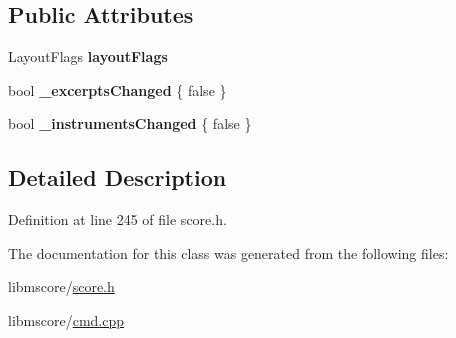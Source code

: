 \subsection*{Public Attributes}
\begin{DoxyCompactItemize}
\item 
\mbox{\label{class_ms_1_1_cmd_state_ac88dbdeaaad59bd618bab18774ecf8a9}} 
Layout\+Flags {\bfseries layout\+Flags}
\item 
\mbox{\label{class_ms_1_1_cmd_state_aa17ab68ed1b01f07c63da9cc4650e7e3}} 
bool {\bfseries \+\_\+excerpts\+Changed} \{ false \}
\item 
\mbox{\label{class_ms_1_1_cmd_state_aeee6bd7515ff97c9cdc58a16e5b46f95}} 
bool {\bfseries \+\_\+instruments\+Changed} \{ false \}
\end{DoxyCompactItemize}


\subsection{Detailed Description}


Definition at line 245 of file score.\+h.



The documentation for this class was generated from the following files\+:\begin{DoxyCompactItemize}
\item 
libmscore/\hyperlink{score_8h}{score.\+h}\item 
libmscore/\hyperlink{cmd_8cpp}{cmd.\+cpp}\end{DoxyCompactItemize}
